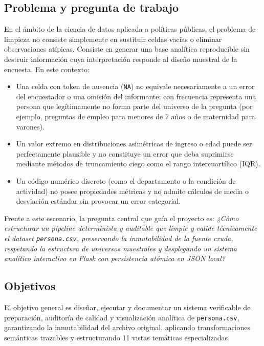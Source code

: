 \subsection{Problema y pregunta de trabajo}
En el ámbito de la ciencia de datos aplicada a políticas públicas, el problema de limpieza no consiste simplemente en sustituir celdas vacías o eliminar observaciones atípicas. Consiste en generar una base analítica reproducible sin destruir información cuya interpretación responde al diseño muestral de la encuesta. En este contexto:
\begin{itemize}[leftmargin=0.5in]
  \item Una celda con token de ausencia (\texttt{NA}) no equivale necesariamente a un error del encuestador o una omisión del informante: con frecuencia representa una persona que legítimamente no forma parte del universo de la pregunta (por ejemplo, preguntas de empleo para menores de 7 años o de maternidad para varones).
  \item Un valor extremo en distribuciones asimétricas de ingreso o edad puede ser perfectamente plausible y no constituye un error que deba suprimirse mediante métodos de truncamiento ciego como el rango intercuartílico (IQR).
  \item Un código numérico discreto (como el departamento o la condición de actividad) no posee propiedades métricas y no admite cálculos de media o desviación estándar sin provocar un error categorial.
\end{itemize}

Frente a este escenario, la pregunta central que guía el proyecto es: \textit{¿Cómo estructurar un pipeline determinista y auditable que limpie y valide técnicamente el dataset \texttt{persona.csv}, preservando la inmutabilidad de la fuente cruda, respetando la estructura de universos muestrales y desplegando un sistema analítico interactivo en Flask con persistencia atómica en JSON local?}

\subsection{Objetivos}
El objetivo general es diseñar, ejecutar y documentar un sistema verificable de preparación, auditoría de calidad y visualización analítica de \texttt{persona.csv}, garantizando la inmutabilidad del archivo original, aplicando transformaciones semánticas trazables y estructurando 11 vistas temáticas especializadas.

